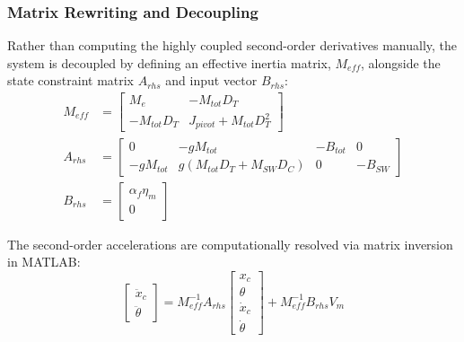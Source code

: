 \documentclass[11pt,a4paper]{article}
\begin{document}
\subsubsection{Matrix Rewriting and Decoupling}\label{subsub:seesaw_ss_decoupling}
Rather than computing the highly coupled second-order derivatives manually, the system is decoupled by defining an effective inertia matrix, $M_{eff}$, alongside the state constraint matrix $A_{rhs}$ and input vector $B_{rhs}$:
\begin{equation}
\begin{aligned}
M_{eff} &= \begin{bmatrix} M_e & -M_{tot}D_T \\ -M_{tot}D_T & J_{pivot} + M_{tot}D_T^2 \end{bmatrix} \\
A_{rhs} &= \begin{bmatrix} 0 & -gM_{tot} & -B_{tot} & 0 \\ -gM_{tot} & g(M_{tot}D_T + M_{SW}D_C) & 0 & -B_{SW} \end{bmatrix} \\
B_{rhs} &= \begin{bmatrix} \alpha_f \eta_m \\ 0 \end{bmatrix}
\end{aligned}
\end{equation}

The second-order accelerations are computationally resolved via matrix inversion in MATLAB:
\begin{equation}
\begin{bmatrix} \ddot{x}_c \\ \ddot{\theta} \end{bmatrix} = M_{eff}^{-1} A_{rhs} \begin{bmatrix} x_c \\ \theta \\ \dot{x}_c \\ \dot{\theta} \end{bmatrix} + M_{eff}^{-1} B_{rhs} V_m
\end{equation}
\end{document}
